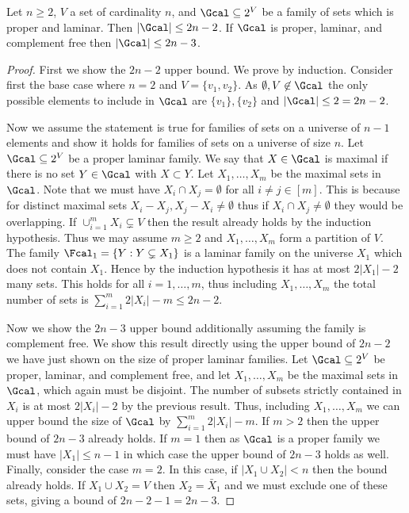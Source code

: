 \begin{lemma}
\label{lem:laminar_size}
Let $n \ge 2$, $V$ a set of cardinality $n$, and $\Gcal \subseteq 2^{V}$ be a family of sets which is proper and laminar.  Then
$|\Gcal| \le 2n-2$.  If $\Gcal$ is proper, laminar, and complement free then $|\Gcal| \le 2n-3$.
\end{lemma}

\begin{proof}
First we show the $2n-2$ upper bound.
We prove by induction.  Consider first the base case where $n=2$ and $V = \{v_1, v_2\}$.  As $\emptyset, V \not \in \Gcal$ the only possible elements to include in $\Gcal$
are $\{v_1\}, \{v_2\}$ and $|\Gcal| \le 2 = 2n-2$.

Now we assume the statement is true for families of sets on a universe of $n-1$ elements and show it holds for families of sets on a universe of size $n$.  Let
$\Gcal \subseteq 2^{V}$ be a proper laminar family.  We say that $X \in \Gcal$ is maximal
if there is no set $Y \in \Gcal$ with $X \subset Y$.  Let $X_1, \ldots, X_m$ be the maximal sets in $\Gcal$.  Note that we must have
$X_i \cap X_j = \emptyset$ for all $i\ne j \in [m]$.  This is because for distinct maximal sets $X_i - X_j, X_j - X_i \ne \emptyset$ thus if
$X_i \cap X_j \ne \emptyset$ they would be overlapping.  If $\cup_{i=1}^m X_i \subsetneq V$ then the result already holds by the induction hypothesis.
Thus we may assume $m \ge 2$ and $X_1, \ldots, X_m$ form a partition of $V$.
The family $\Fcal_1 = \{Y : Y \subsetneq X_1\}$ is a laminar family on the universe $X_1$ which does not contain $X_1$.  Hence by the induction hypothesis it has at most $2|X_1|-2$ many sets.  This holds for all
$i =1, \ldots, m$, thus including $X_1, \ldots, X_m$ the total number of sets is $\sum_{i=1}^m 2|X_i| - m \le 2n-2$.

Now we show the $2n-3$ upper bound additionally assuming the family is complement free.  We show this result directly using the upper bound
of $2n-2$ we have just shown on the size of proper laminar families.  Let $\Gcal \subseteq 2^{V}$ be proper, laminar, and complement free,
and let $X_1, \ldots, X_m$ be the maximal sets in $\Gcal$, which again must be disjoint.  The number of subsets strictly contained in $X_i$ is at most $2|X_i| - 2$ by the previous result.  Thus, including $X_1, \ldots, X_m$
we can upper bound the size of $\Gcal$ by $\sum_{i=1}^m 2|X_i| - m$.  If $m > 2$ then the upper bound of $2n-3$ already holds.  If $m=1$ then as $\Gcal$ is
a proper family we must have $|X_1| \le n-1$ in which case the upper bound of $2n-3$ holds as well.  Finally, consider the case $m=2$.  In this case, if $|X_1 \cup X_2| < n$ then
the bound already holds.  If $X_1 \cup X_2 = V$ then $X_2 = \bar{X}_1$ and we must exclude one of these sets, giving a bound of $2n-2-1 = 2n-3$.
\end{proof}


